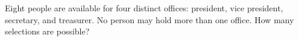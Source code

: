 Eight people are available for four distinct offices: president, vice president, secretary, and treasurer. No person may hold more than one office. How many selections are possible?
